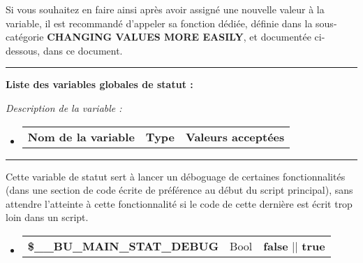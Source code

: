 \documentclass[a4paper,10pt]{article}
\begin{document}
\begin{justify}
    Si vous souhaitez en faire ainsi après avoir assigné une nouvelle valeur à la variable, il est recommandé d'appeler sa fonction dédiée, définie dans la sous-catégorie \textbf{\color{sec2}CHANGING VALUES MORE EASILY}, et documentée ci-dessous, dans ce document.
\end{justify}


\par\noindent\rule{\textwidth}{0.4pt}

\begin{justify}
     \textbf{Liste des variables globales de statut :}
\end{justify}

\begin{justify}
    \textit{Description de la variable :}
\end{justify}

\begin{justify}
     \begin{itemize}
        \item
        {
            \begin{tabular}{l|l|l}
                \textbf{Nom de la variable} & \textbf{Type} & \textbf{Valeurs acceptées}
            \end{tabular}
        }
    \end{itemize}
\end{justify}


\par\noindent\rule{\textwidth}{0.4pt}

\begin{justify}
    Cette variable de statut sert à lancer un déboguage de certaines fonctionnalités (dans une section de code écrite de préférence au début du script principal), sans attendre l'atteinte à cette fonctionnalité si le code de cette dernière est écrit trop loin dans un script.
\end{justify}

\begin{justify}
     \begin{itemize}
        \item
        {
            \begin{tabular}{l|l|l}
                \textbf{\color{vars}\$\_\_BU\_MAIN\_STAT\_DEBUG}  & Bool & \textbf{false} || \textbf{true} \\[1\baselineskip]
            \end{tabular}
        }
    \end{itemize}
\end{justify}
\end{document}
